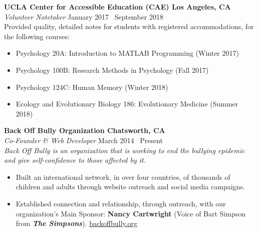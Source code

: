 {\bf UCLA Center for Accessible Education (CAE) \hfill Los Angeles, CA} \\
{\it Volunteer Notetaker} \hfill January 2017 \textendash\ September 2018 \\
Provided quality, detailed notes for students with registered accommodations, for the following courses:
\begin{itemize} \itemsep -2pt
	\item Psychology 20A: Introduction to MATLAB Programming (Winter 2017)
	\item Psychology 100B: Research Methods in Psychology (Fall 2017)
	\item Psychology 124C: Human Memory (Winter 2018)
	\item Ecology and Evolutionary Biology 186: Evolutionary Medicine (Summer 2018)
\end{itemize}
	
{\bf Back Off Bully Organization \hfill Chatsworth, CA} \\
{\it Co-Founder \& Web Developer} \hfill March 2014 \textendash\ Present \\
{\sl Back Off Bully is an organization that is working to end the bullying epidemic and give self-confidence to those affected by it.}
\begin{itemize} \itemsep -2pt
	\item Built an international network, in over four countries, of thousands of children and adults through website outreach and social media campaigns. 
	\item Established connection and relationship, through outreach, with our organization's Main Sponsor: {\bf Nancy Cartwright} (Voice of Bart Simpson from {\bf \it The Simpsons}). \textcolor{RoyalBlue}{\href{https://backoffbully.org}{backoffbully.org}}
\end{itemize}